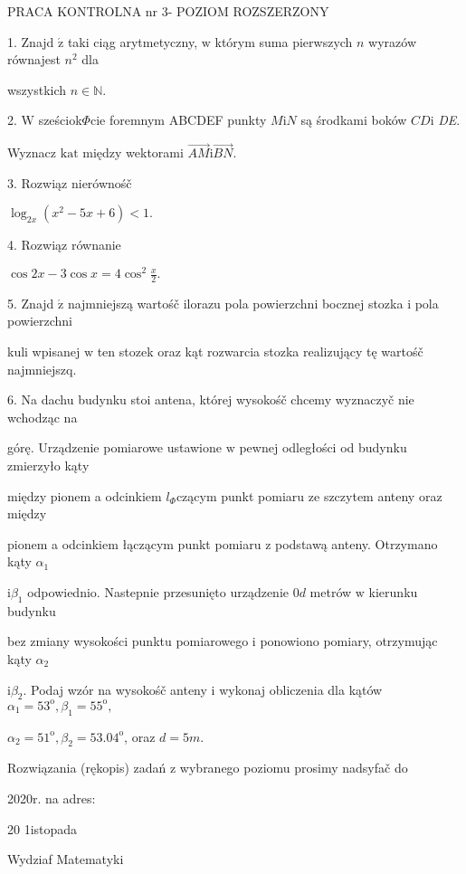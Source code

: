 \documentclass[a4paper,12pt]{article}
\begin{document}
PRACA KONTROLNA nr 3- POZIOM ROZSZERZONY

1. Znajd $\acute{\mathrm{z}}$ taki ciąg arytmetyczny, $\mathrm{w}$ którym suma pierwszych $n$ wyrazów równajest $n^{2}$ dla

wszystkich $n\in \mathbb{N}.$

2. $\mathrm{W}$ sześciok$\Phi$cie foremnym ABCDEF punkty $M \mathrm{i} N$ są środkami boków $CD \mathrm{i}$ {\it DE}.

Wyznacz $\mathrm{k}\mathrm{a}\mathrm{t}$ między wektorami $\vec{AM}\mathrm{i}\vec{BN}.$

3. Rozwiąz nierównośč

$\log_{2x}(x^{2}-5x+6)<1.$

4. Rozwiąz równanie

$\displaystyle \cos 2x-3\cos x=4\cos^{2}\frac{x}{2}.$

5. Znajd $\acute{\mathrm{z}}$ najmniejszą wartośč ilorazu pola powierzchni bocznej stozka $\mathrm{i}$ pola powierzchni

kuli wpisanej $\mathrm{w}$ ten stozek oraz kąt rozwarcia stozka realizujący tę wartośč najmniejszq.

6. Na dachu budynku stoi antena, której wysokośč chcemy wyznaczyč nie wchodząc na

górę. Urządzenie pomiarowe ustawione $\mathrm{w}$ pewnej odległości od budynku zmierzyło kąty

między pionem a odcinkiem $l_{\Phi}$czącym punkt pomiaru ze szczytem anteny oraz między

pionem a odcinkiem łączącym punkt pomiaru $\mathrm{z}$ podstawą anteny. Otrzymano kąty $\alpha_{1}$

$\mathrm{i}\beta_{1}$ odpowiednio. Nastepnie przesunięto urządzenie $0d$ metrów $\mathrm{w}$ kierunku budynku

bez zmiany wysokości punktu pomiarowego $\mathrm{i}$ ponowiono pomiary, otrzymując kąty $\alpha_{2}$

$\mathrm{i}\beta_{2}$. Podaj wzór na wysokośč anteny $\mathrm{i}$ wykonaj obliczenia dla kątów $\alpha_{1}=53^{\mathrm{o}}, \beta_{1}=55^{\mathrm{o}},$

$\alpha_{2}=51^{\mathrm{o}}, \beta_{2}=53.04^{\mathrm{o}}$, oraz $d=5m.$

Rozwiązania (rękopis) zadań z wybranego poziomu prosimy nadsyfač do

2020r. na adres:

20 1istopada

Wydziaf Matematyki
\end{document}
